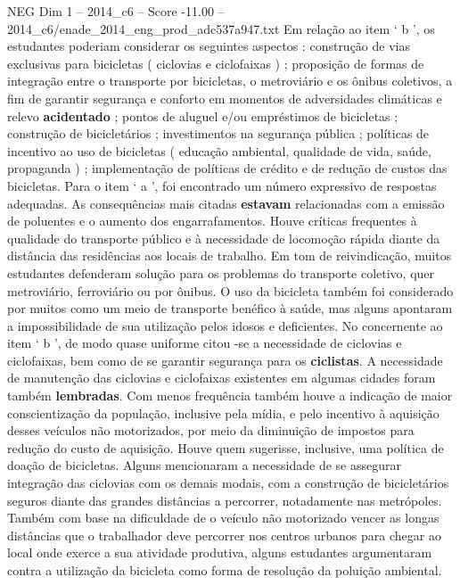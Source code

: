 \begin{textsample}{NEG Dim 1 – 2014\_c6 – Score -11.00 – 2014\_c6/enade\_2014\_eng\_prod\_adc537a947.txt}
Em relação ao item ‘ b ’, os estudantes poderiam considerar os seguintes aspectos : construção de vias exclusivas para bicicletas ( ciclovias e ciclofaixas ) ; proposição de formas de integração entre o transporte por bicicletas, o metroviário e os ônibus coletivos, a fim de garantir segurança e conforto em momentos de adversidades climáticas e relevo \textbf{acidentado} ; pontos de aluguel e/ou empréstimos de bicicletas ; construção de bicicletários ; investimentos na segurança pública ; políticas de incentivo ao uso de bicicletas ( educação ambiental, qualidade de vida, saúde, propaganda ) ; implementação de políticas de crédito e de redução de custos das bicicletas.
Para o item ‘ a ’, foi encontrado um número expressivo de respostas adequadas.
As consequências mais citadas \textbf{estavam} relacionadas com a emissão de poluentes e o aumento dos engarrafamentos.
Houve críticas frequentes à qualidade do transporte público e à necessidade de locomoção rápida diante da distância das residências aos locais de trabalho.
Em tom de reivindicação, muitos estudantes defenderam solução para os problemas do transporte coletivo, quer metroviário, ferroviário ou por ônibus.
O uso da bicicleta também foi considerado por muitos como um meio de transporte benéfico à saúde, mas alguns apontaram a impossibilidade de sua utilização pelos idosos e deficientes.
No concernente ao item ‘ b ’, de modo quase uniforme citou -se a necessidade de ciclovias e ciclofaixas, bem como de se garantir segurança para os \textbf{ciclistas}.
A necessidade de manutenção das ciclovias e ciclofaixas existentes em algumas cidades foram também \textbf{lembradas}.
Com menos frequência também houve a indicação de maior conscientização da população, inclusive pela mídia, e pelo incentivo à aquisição desses veículos não motorizados, por meio da diminuição de impostos para redução do custo de aquisição.
Houve quem sugerisse, inclusive, uma política de doação de bicicletas.
Alguns mencionaram a necessidade de se assegurar integração das ciclovias com os demais modais, com a construção de bicicletários seguros diante das grandes distâncias a percorrer, notadamente nas metrópoles.
Também com base na dificuldade de o veículo não motorizado vencer as longas distâncias que o trabalhador deve percorrer nos centros urbanos para chegar ao local onde exerce a sua atividade produtiva, alguns estudantes argumentaram contra a utilização da bicicleta como forma de resolução da poluição ambiental.

\end{textsample}
